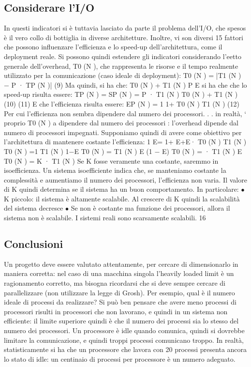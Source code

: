 \subsection{Considerare l'I/O}
In questi indicatori si è tuttavia lasciato da parte il problema dell'I/O, che
spesos è il vero collo di bottiglia in diverse architetture. Inoltre, vi son diversi
15
fattori che possono influenzare l'efficienza e lo speed-up dell'architettura, come
il deployment reale. Si possono quindi estendere gli indicatori considerando
l'eetto generale dell'overhead, T0 (N ), che rappresenta le risorse e il tempo
realmente utilizzato per la comunicazione (caso ideale di deployment):
T0 (N ) = |T1 (N ) $-$ P · TP (N )|
(9)
Ma quindi, si ha che:
T0 (N ) + T1 (N )
P
E si ha che che lo speed-up risulta essere:
TP (N ) =
SP (N ) =
P · T1 (N )
T0 (N ) + T1 (N )
(10)
(11)
E che l'efficienza risulta essere:
EP (N ) =
1
1+
T0 (N )
T1 (N )
(12)
Per cui l'efficienza non sembra dipendere dal numero dei processori. . . in realtà,
` proprio T0 (N ) a dipendere dal numero dei processori : l'overhead dipende dal
numero di processori impegnati.
Supponiamo quindi di avere come obiettivo per l'architettura di mantenere
costante l'efficienza:
1
E=
1+
E+E·
T0 (N )
T1 (N )
T0 (N )
=1
T1 (N )
1$-$E
T0 (N )
=
T1 (N )
E
(1 $-$ E)
T0 (N ) =
· T1 (N )
E
T0 (N ) = K · T1 (N )
Se K fosse veramente una costante, saremmo in isoefficienza. Un sistema isoefficiente indica che, se manteniamo costante
la
complessità e aumentiamo il
numero dei processori, l'efficienza non varia. Il valore di K quindi determina se
il sistema ha un buon comportamento. In particolare:
$\bullet$ K piccolo: il sistema è altamente scalabile. Al crescere di K quindi la
scalabilità del sistema decresce
$\bullet$ Se non è costante ma funzione dei processori, allora il sistema non è
scalabile.
I sistemi reali sono scarsamente scalabili.
16
\subsection{Conclusioni}
Un progetto deve essere valutato attentamente, per cercare di dimensionarlo in maniera corretta: nel caso di una
macchina singola l'heavily loaded limit è un ragionamento corretto, ma bisogna ricordarsi che si deve sempre cercare di
parallelizzare (non utilizzare la legge di Grosh). Per esempio, qual è il numero ideale di processi da realizzare? Si
può ben pensare che avere meno processi di processori risulti in processori che non lavorano, e quindi in un sistema 
non efficiente: il limite superiore quindi è che il numero dei processi sia lo stesso del numero dei processori. Un
processore è idle quando comunica, quindi si dovrebbe limitare la comunicazione, e quindi troppi processi comunicano
troppo.
In realtà, statisticamente si ha che un processore che lavora con 20 processi presenta ancora lo stato di idle: un
centinaio di processi per processore è un numero adeguato.